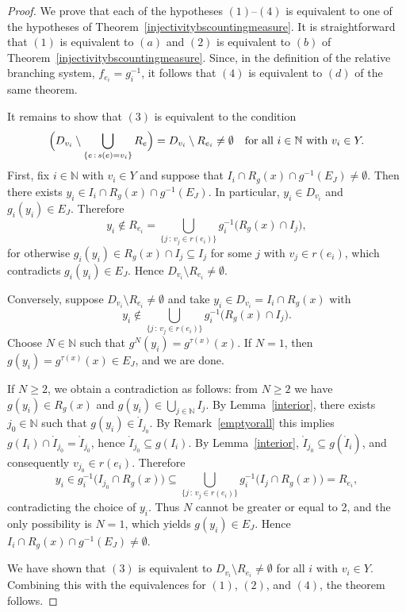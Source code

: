 \documentclass[12pt, reqno]{amsart}
\theoremstyle{definition}
\theoremstyle{remark}
\numberwithin{equation}{section}
\begin{document}
\begin{proof}
We prove that each of the hypotheses \((1)\)--\((4)\) is equivalent to one of
the hypotheses of Theorem~\ref{injectivitybscountingmeasure}. It is
straightforward that \((1)\) is equivalent to \((a)\) and \((2)\) is equivalent
to \((b)\) of Theorem~\ref{injectivitybscountingmeasure}. Since, in the
definition of the relative branching system, \(f_{e_i}=g_i^{-1}\), it follows
that \((4)\) is equivalent to \((d)\) of the same theorem.

It remains to show that \((3)\) is equivalent to the condition
\[
\Bigl(D_{v_i}\setminus \bigcup_{\{e\,:\,s(e)=v_i\}} R_e\Bigr)
= D_{v_i}\setminus R_{e_i}\neq \emptyset
\quad\text{for all } i\in\mathbb{N} \text{ with } v_i\in Y.
\]
First, fix \(i\in\mathbb{N}\) with \(v_i\in Y\) and suppose that
\(I_i\cap R_g(x)\cap g^{-1}(E_J)\neq\emptyset\). Then there exists
\(y_i\in I_i\cap R_g(x)\cap g^{-1}(E_J)\). In particular, \(y_i\in D_{v_i}\)
and \(g_i(y_i)\in E_J\). Therefore
\[
y_i\notin R_{e_i}
=\bigcup_{\{j\,:\, v_j\in r(e_i)\}} g_i^{-1}\bigl(R_g(x)\cap I_j\bigr),
\]
for otherwise \(g_i(y_i)\in R_g(x)\cap I_j\subseteq I_j\) for some
\(j\) with \(v_j\in r(e_i)\), which contradicts \(g_i(y_i)\in E_J\).
Hence \(D_{v_i}\setminus R_{e_i}\neq\emptyset\).

Conversely, suppose \(D_{v_i}\setminus R_{e_i}\neq\emptyset\) and take
\(y_i\in D_{v_i}=I_i\cap R_g(x)\) with
\[
y_i\notin \bigcup_{\{j\,:\, v_j\in r(e_i)\}} g_i^{-1}\bigl(R_g(x)\cap I_j\bigr).
\]
Choose \(N\in\mathbb{N}\) such that \(g^N(y_i)=g^{\tau(x)}(x)\).
If \(N=1\), then \(g(y_i)=g^{\tau(x)}(x)\in E_J\), and we are done.

If \(N\ge 2\), we obtain a contradiction as follows: from \(N\ge 2\) we have
\(g(y_i)\in R_g(x)\) and \(g(y_i)\in \bigcup_{j\in\mathbb{N}} I_j\). By
Lemma~\ref{interior}, there exists \(j_0\in\mathbb{N}\) such that
\(g(y_i)\in \mathring{I}_{j_0}\). By Remark~\ref{emptyorall} this implies
\(g(I_i)\cap \mathring{I}_{j_0}=\mathring{I}_{j_0}\), hence
\(\mathring{I}_{j_0}\subseteq g(I_i)\). By Lemma~\ref{interior},
\(\mathring{I}_{j_0}\subseteq g(\mathring{I}_i)\), and consequently
\(v_{j_0}\in r(e_i)\). Therefore
\[
y_i \in g_i^{-1}\bigl(I_{j_0}\cap R_g(x)\bigr)
\subseteq \bigcup_{\{j\,:\, v_j\in r(e_i)\}} g_i^{-1}\bigl(I_j\cap R_g(x)\bigr)
= R_{e_i},
\]
contradicting the choice of \(y_i\). Thus \(N\) cannot be greater or equal to 2, and the only
possibility is \(N=1\), which yields \(g(y_i)\in E_J\). Hence
\(I_i\cap R_g(x)\cap g^{-1}(E_J)\neq\emptyset\).

We have shown that \((3)\) is equivalent to
\(D_{v_i}\setminus R_{e_i}\neq\emptyset\) for all \(i\) with \(v_i\in Y\).
Combining this with the equivalences for \((1)\), \((2)\), and \((4)\), the
theorem follows.
\end{proof}
\end{document}
